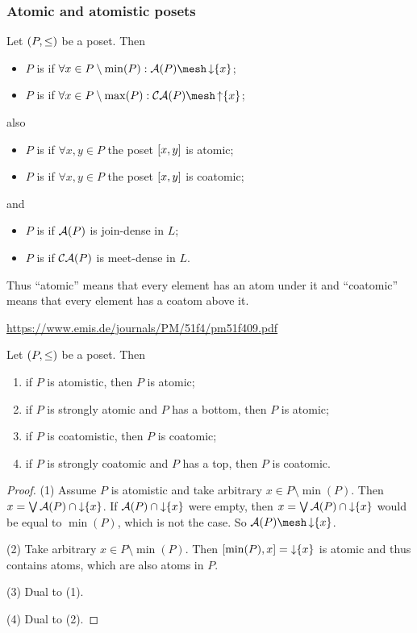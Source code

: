 \subsubsection{Atomic and atomistic posets}
\begin{definition}
Let $\sSet{P,\leq}$ be a poset. Then
\begin{itemize}
\item $P$ is  if $\forall x\in P\setminus\min(P): \atoms(P)\mesh \downset\{x\}$;
\item $P$ is  if $\forall x\in P\setminus\max(P): \coatoms(P)\mesh \upset\{x\}$;
\end{itemize}
also
\begin{itemize}
\item $P$ is  if $\forall x,y\in P$ the poset $\interval{x,y}$ is atomic;
\item $P$ is  if $\forall x,y \in P$ the poset $\interval{x,y}$ is coatomic;
\end{itemize}
and
\begin{itemize}
\item $P$ is  if $\operatorname{\mathcal{A}}(P)$ is join-dense in $L$;
\item $P$ is  if $\operatorname{\mathcal{CA}}(P)$ is meet-dense in $L$.
\end{itemize}
\end{definition}
Thus ``atomic'' means that every element has an atom under it and ``coatomic'' means that every element has a coatom above it.

\url{https://www.emis.de/journals/PM/51f4/pm51f409.pdf}

\begin{lemma}
Let $\sSet{P,\leq}$ be a poset. Then
\begin{enumerate}
\item if $P$ is atomistic, then $P$ is atomic;
\item if $P$ is strongly atomic and $P$ has a bottom, then $P$ is atomic;
\item if $P$ is coatomistic, then $P$ is coatomic;
\item if $P$ is strongly coatomic and $P$ has a top, then $P$ is coatomic.
\end{enumerate}
\end{lemma}
\begin{proof}
(1) Assume $P$ is atomistic and take arbitrary $x\in P\setminus\min(P)$. Then $x = \bigvee \operatorname{\mathcal{A}}(P)\cap \operatorname{\downarrow}\{x\}$. If $\operatorname{\mathcal{A}}(P)\cap \operatorname{\downarrow}\{x\}$ were empty, then $x = \bigvee \operatorname{\mathcal{A}}(P)\cap \operatorname{\downarrow}\{x\}$ would be equal to $\min(P)$, which is not the case. So $\atoms(P)\mesh \downset\{x\}$.

(2) Take arbitrary $x\in P\setminus\min(P)$. Then $\interval{\min(P), x} = \downset\{x\}$ is atomic and thus contains atoms, which are also atoms in $P$.

(3) Dual to (1).

(4) Dual to (2).
\end{proof}

